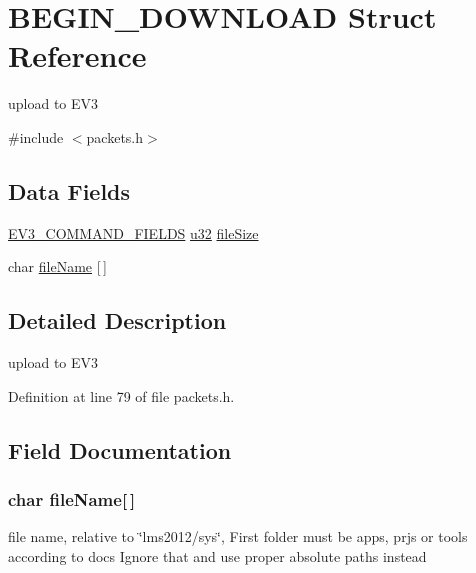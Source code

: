 \hypertarget{struct_b_e_g_i_n___d_o_w_n_l_o_a_d}{}\section{B\+E\+G\+I\+N\+\_\+\+D\+O\+W\+N\+L\+O\+A\+D Struct Reference}
\label{struct_b_e_g_i_n___d_o_w_n_l_o_a_d}


upload to E\+V3  




{\ttfamily \#include $<$packets.\+h$>$}

\subsection*{Data Fields}
\begin{DoxyCompactItemize}
\item 
\hyperlink{packets_8h_a0c26a010ef0da2962a751796943824c9}{E\+V3\+\_\+\+C\+O\+M\+M\+A\+N\+D\+\_\+\+F\+I\+E\+L\+D\+S} \hyperlink{defs_8h_afaa62991928fb9fb18ff0db62a040aba}{u32} \hyperlink{struct_b_e_g_i_n___d_o_w_n_l_o_a_d_a2fa3c7a96f94c5dec20b07223cc8562e}{file\+Size}
\item 
char \hyperlink{struct_b_e_g_i_n___d_o_w_n_l_o_a_d_ac7c25075c755b642c1861936c4615beb}{file\+Name} \mbox{[}$\,$\mbox{]}
\end{DoxyCompactItemize}


\subsection{Detailed Description}
upload to E\+V3 

Definition at line 79 of file packets.\+h.



\subsection{Field Documentation}
\hypertarget{struct_b_e_g_i_n___d_o_w_n_l_o_a_d_ac7c25075c755b642c1861936c4615beb}{}
\subsubsection[{file\+Name}]{\setlength{\rightskip}{0pt plus 5cm}char file\+Name\mbox{[}$\,$\mbox{]}}\label{struct_b_e_g_i_n___d_o_w_n_l_o_a_d_ac7c25075c755b642c1861936c4615beb}
file name, relative to \char`\"{}lms2012/sys\char`\"{}, First folder must be apps, prjs or tools according to docs Ignore that and use proper absolute paths instead 


